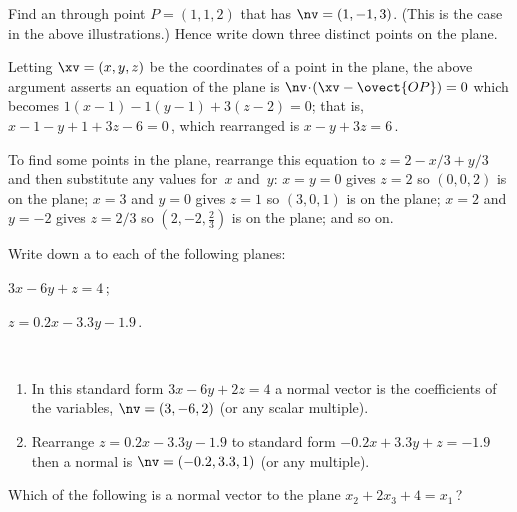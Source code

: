 \begin{example} \label{eg:}
Find an  through point \(P=(1,1,2)\) that has  \(\nv=(1,-1,3)\).
(This is the case in the above illustrations.)
Hence write down three distinct points on the plane.
\begin{solution} 
Letting \(\xv=(x,y,z)\) be the coordinates of a point in the plane, the above argument asserts an equation of the plane is \(\nv\cdot(\xv-\ovect{OP})=0\) which becomes
\(1(x-1)-1(y-1)+3(z-2)=0\); that is, \(x-1-y+1+3z-6=0\)\,, which rearranged is \(x-y+3z=6\)\,. 

To find some points in the plane, rearrange this equation to \(z=2-x/3+y/3\) and then substitute any values for~\(x\) and~\(y\):  
\(x=y=0\) gives \(z=2\) so \((0,0,2)\) is on the plane; 
\(x=3\) and \(y=0\) gives \(z=1\) so \((3,0,1)\) is on the plane;
\(x=2\) and \(y=-2\) gives \(z=2/3\) so \((2,-2,\frac23)\) is on the plane; and so on.
\end{solution}
\end{example}





\begin{example} \label{eg:}
Write down a  to each of the following planes:
\begin{parts}
\item \(3x-6y+z=4\)\,;
\item \(z=0.2x-3.3y-1.9\)\,.
\end{parts}
\begin{solution} \ 
\begin{enumerate}
\item In this standard form \(3x-6y+2z=4\) a normal vector is the coefficients of the variables, \(\nv=(3,-6,2)\) (or any scalar multiple).
\item Rearrange \(z=0.2x-3.3y-1.9\) to standard form \(-0.2x+3.3y+z=-1.9\) then a normal is \(\nv=(-0.2,3.3,1)\) (or any multiple).
\end{enumerate} 
\end{solution}
\end{example}




\begin{activity}
Which of the following is a normal vector to the plane \(x_2+2x_3+4=x_1\)\,?
\actposs{\((-1,1,2)\)}{\((1,2,1)\)}{\((1,2,4)\)}{none of these}
\end{activity}




